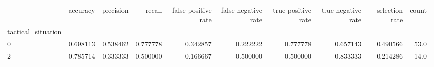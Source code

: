 \begin{tabular}{lrrrrrrrrr}
\toprule
{} &  accuracy &  precision &    recall &  false positive rate &  false negative rate &  true positive rate &  true negative rate &  selection rate &  count \\
tactical\_situation &           &            &           &                      &                      &                     &                     &                 &        \\
\midrule
0                  &  0.698113 &   0.538462 &  0.777778 &             0.342857 &             0.222222 &            0.777778 &            0.657143 &        0.490566 &   53.0 \\
2                  &  0.785714 &   0.333333 &  0.500000 &             0.166667 &             0.500000 &            0.500000 &            0.833333 &        0.214286 &   14.0 \\
\bottomrule
\end{tabular}
